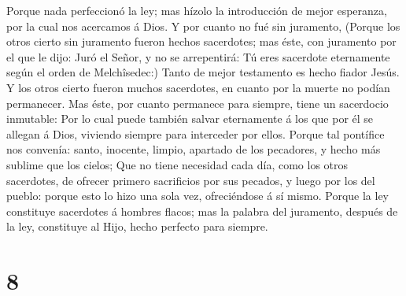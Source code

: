 Porque nada perfeccionó la ley; mas hízolo la introducción de mejor
esperanza, por la cual nos acercamos á Dios.  Y por cuanto
no fué sin juramento,  (Porque los otros cierto sin
juramento fueron hechos sacerdotes; mas éste, con juramento por el que
le dijo: Juró el Señor, y no se arrepentirá: Tú eres sacerdote
eternamente según el orden de Melchîsedec:)  Tanto de mejor
testamento es hecho fiador Jesús.  Y los otros cierto
fueron muchos sacerdotes, en cuanto por la muerte no podían permanecer.
 Mas éste, por cuanto permanece para siempre, tiene un
sacerdocio inmutable:  Por lo cual puede también salvar
eternamente á los que por él se allegan á Dios, viviendo siempre para
interceder por ellos.  Porque tal pontífice nos convenía:
santo, inocente, limpio, apartado de los pecadores, y hecho más sublime
que los cielos;  Que no tiene necesidad cada día, como los
otros sacerdotes, de ofrecer primero sacrificios por sus pecados, y
luego por los del pueblo: porque esto lo hizo una sola vez, ofreciéndose
á sí mismo.  Porque la ley constituye sacerdotes á hombres
flacos; mas la palabra del juramento, después de la ley, constituye al
Hijo, hecho perfecto para siempre.

\hypertarget{section-7}{%
\section{8}\label{section-7}}

